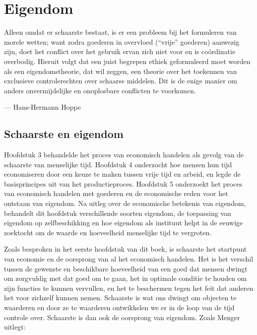 \chapter{Eigendom}

\begin{blockquotebox}
    Alleen omdat er schaarste bestaat, is er een probleem bij het formuleren van morele wetten; want zodra goederen in overvloed (\enquote{vrije} goederen) aanwezig zijn, doet het conflict over het gebruik ervan zich niet voor en is coördinatie overbodig. Hieruit volgt dat een juist begrepen ethiek geformuleerd moet worden als een eigendomstheorie, dat wil zeggen, een theorie over het toekennen van exclusieve controlerechten over schaarse middelen. Dit is de enige manier om anders onvermijdelijke en onoplosbare conflicten te voorkomen.\footnotemark
    \par\raggedleft--- Hans-Hermann Hoppe
\end{blockquotebox}


\section{Schaarste en eigendom}

\lettrine{H}oofdstuk 3 behandelde het proces van economisch handelen als gevolg van de schaarste van menselijke tijd. Hoofdstuk 4 onderzocht hoe mensen hun tijd economiseren door een keuze te maken tussen vrije tijd en arbeid, en legde de basisprincipes uit van het productieproces. Hoofdstuk 5 onderzoekt het proces van economisch handelen met goederen en de economische reden voor het ontstaan van eigendom. Na uitleg over de economische betekenis van eigendom, behandelt dit hoofdstuk verschillende soorten eigendom, de toepassing van eigendom op zelfbeschikking en hoe eigendom als instituut helpt in de eeuwige zoektocht om de waarde en hoeveelheid menselijke tijd te vergroten.

Zoals besproken in het eerste hoofdstuk van dit boek, is schaarste het startpunt van economie en de oorsprong van al het economisch handelen. Het is het verschil tussen de gewenste en beschikbare hoeveelheid van een goed dat mensen dwingt om zorgvuldig met dat goed om te gaan, het in optimale conditie te houden om zijn functies te kunnen vervullen, en het te beschermen tegen het feit dat anderen het voor zichzelf kunnen nemen. Schaarste is wat ons dwingt om objecten te waarderen en door ze te waarderen ontwikkelen we er in de loop van de tijd controle over. Schaarste is dan ook de oorsprong van eigendom. Zoals Menger uitlegt:

